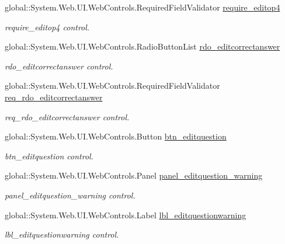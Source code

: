 \begin{DoxyCompactItemize}
global\+::\+System.\+Web.\+U\+I.\+Web\+Controls.\+Required\+Field\+Validator \mbox{\hyperlink{class_admin__editquestion_a6942a48cfc8c865d934f5cd6d1388c28}{require\+\_\+editop4}}
\begin{DoxyCompactList}\small\item\em require\+\_\+editop4 control. \end{DoxyCompactList}\item 
global\+::\+System.\+Web.\+U\+I.\+Web\+Controls.\+Radio\+Button\+List \mbox{\hyperlink{class_admin__editquestion_a8e7da5bbc93c3a9942707544e8b45cee}{rdo\+\_\+editcorrectanswer}}
\begin{DoxyCompactList}\small\item\em rdo\+\_\+editcorrectanswer control. \end{DoxyCompactList}\item 
global\+::\+System.\+Web.\+U\+I.\+Web\+Controls.\+Required\+Field\+Validator \mbox{\hyperlink{class_admin__editquestion_a6813864e69eec1b7fa25d61cd0bd929e}{req\+\_\+rdo\+\_\+editcorrectanswer}}
\begin{DoxyCompactList}\small\item\em req\+\_\+rdo\+\_\+editcorrectanswer control. \end{DoxyCompactList}\item 
global\+::\+System.\+Web.\+U\+I.\+Web\+Controls.\+Button \mbox{\hyperlink{class_admin__editquestion_abab48ff720735116f681e0deebbab60a}{btn\+\_\+editquestion}}
\begin{DoxyCompactList}\small\item\em btn\+\_\+editquestion control. \end{DoxyCompactList}\item 
global\+::\+System.\+Web.\+U\+I.\+Web\+Controls.\+Panel \mbox{\hyperlink{class_admin__editquestion_a05b552b1f2ba5b19854e60f2a8bcb77b}{panel\+\_\+editquestion\+\_\+warning}}
\begin{DoxyCompactList}\small\item\em panel\+\_\+editquestion\+\_\+warning control. \end{DoxyCompactList}\item 
global\+::\+System.\+Web.\+U\+I.\+Web\+Controls.\+Label \mbox{\hyperlink{class_admin__editquestion_a383ed071f0da10f6a609017be49932c7}{lbl\+\_\+editquestionwarning}}
\begin{DoxyCompactList}\small\item\em lbl\+\_\+editquestionwarning control. \end{DoxyCompactList}\end{DoxyCompactItemize}

